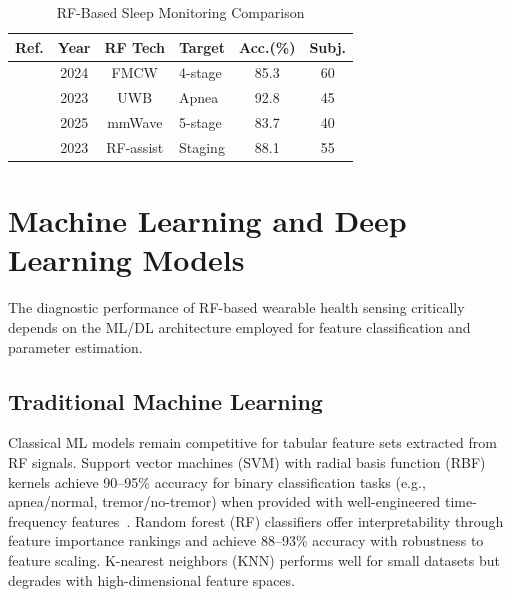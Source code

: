 \documentclass[journal,twoside]{IEEEtran}
\begin{document}
\begin{table}[!t]
\centering
\caption{RF-Based Sleep Monitoring Comparison}
\label{tab:sleep}
\footnotesize
\setlength{\tabcolsep}{2.5pt}
\begin{tabular}{@{}L{1.2cm} c c L{1.4cm} c c@{}}
\toprule
\textbf{Ref.} & \textbf{Year} & \textbf{RF Tech} & \textbf{Target} & \textbf{Acc.(\%)} & \textbf{Subj.} \\
\midrule
\cite{ref_sleep_fmcw2024} & 2024 & FMCW & 4-stage & 85.3 & 60 \\
\cite{ref_sleep_uwb2023} & 2023 & UWB & Apnea & 92.8 & 45 \\
\cite{ref_sleep_mmwave2025} & 2025 & mmWave & 5-stage & 83.7 & 40 \\
\cite{ref_eeg_sleep2023} & 2023 & RF-assist & Staging & 88.1 & 55 \\
\bottomrule
\end{tabular}
\end{table}

\section{Machine Learning and Deep Learning Models}
\label{sec:ml}

The diagnostic performance of RF-based wearable health sensing critically depends on the ML/DL architecture employed for feature classification and parameter estimation.

\subsection{Traditional Machine Learning}

Classical ML models remain competitive for tabular feature sets extracted from RF signals. Support vector machines (SVM) with radial basis function (RBF) kernels achieve 90--95\% accuracy for binary classification tasks (e.g., apnea/normal, tremor/no-tremor) when provided with well-engineered time-frequency features~\cite{ref_mlrf2025}. Random forest (RF) classifiers offer interpretability through feature importance rankings and achieve 88--93\% accuracy with robustness to feature scaling. K-nearest neighbors (KNN) performs well for small datasets but degrades with high-dimensional feature spaces.
\end{document}
